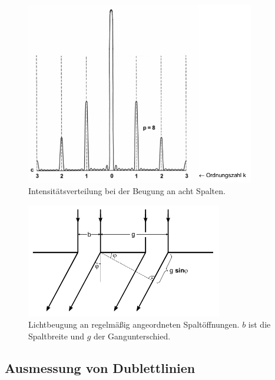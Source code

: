 \begin{figure}
  \centering
  \includegraphics[height=8cm]{MeinFotoalbum:)/Intensitaet.png}
  \caption{Intensitätsverteilung bei der Beugung an acht Spalten.
  \cite{anleitung}}
  \label{fig:Intens}
\end{figure}

\begin{figure}
  \centering
  \includegraphics[height=5cm]{MeinFotoalbum:)/Spalt.png}
  \caption{Lichtbeugung an regelmäßig angeordneten Spaltöffnungen. $b$ ist die
  Spaltbreite und $g$ der Gangunterschied.\cite{anleitung}}
  \label{fig:Beugitter}
\end{figure}

\subsection{Ausmessung von Dublettlinien}
\label{sec:AvD}

